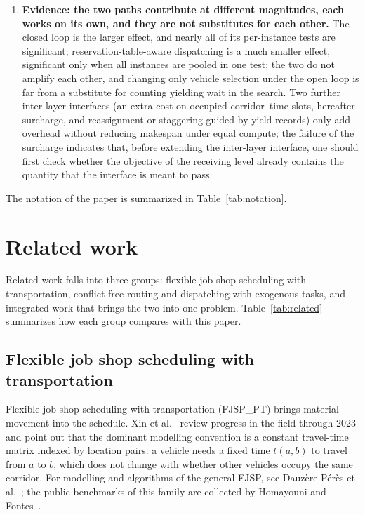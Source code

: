 \begin{enumerate}[leftmargin=*]
\item \textbf{Evidence: the two paths contribute at different magnitudes, each works on its own, and they are not substitutes for each other.} The closed loop is the larger effect, and nearly all of its per-instance tests are significant; reservation-table-aware dispatching is a much smaller effect, significant only when all instances are pooled in one test; the two do not amplify each other, and changing only vehicle selection under the open loop is far from a substitute for counting yielding wait in the search.
Two further inter-layer interfaces (an extra cost on occupied corridor--time slots, hereafter surcharge, and reassignment or staggering guided by yield records) only add overhead without reducing makespan under equal compute; the failure of the surcharge indicates that, before extending the inter-layer interface, one should first check whether the objective of the receiving level already contains the quantity that the interface is meant to pass.


\end{enumerate}

The notation of the paper is summarized in Table~\ref{tab:notation}.



\section{Related work}
\label{sec:Chapter_II}

Related work falls into three groups: flexible job shop scheduling with transportation, conflict-free routing and dispatching with exogenous tasks, and integrated work that brings the two into one problem. Table~\ref{tab:related} summarizes how each group compares with this paper.

\subsection{Flexible job shop scheduling with transportation}

Flexible job shop scheduling with transportation (FJSP\_PT) brings material movement into the schedule. Xin et al.~\cite{xin2025review} review progress in the field through 2023 and point out that the dominant modelling convention is a constant travel-time matrix indexed by location pairs: a vehicle needs a fixed time $t(a,b)$ to travel from $a$ to $b$, which does not change with whether other vehicles occupy the same corridor. For modelling and algorithms of the general FJSP, see Dauz\`ere-P\'er\`es et al.~\cite{dauzereperes2024fjsp}; the public benchmarks of this family are collected by Homayouni and Fontes~\cite{homayouni2021production}.

